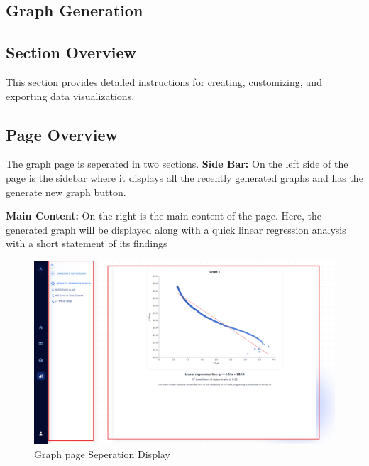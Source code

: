 \documentclass[12pt]{article}
\begin{document}
\subsection{Graph Generation}
\subsection*{Section Overview}
This section provides detailed instructions for creating, customizing, and
exporting data visualizations.

\subsection*{Page Overview}
The graph page is seperated in two sections. 
\newline \newline
\textbf{Side Bar:} \newline
On the left side of the page is the sidebar where it displays all the recently
generated graphs and has the generate new graph button.
\newline\newline

\noindent \textbf{Main Content:}\newline
On the right is the main content of the page. Here, the generated graph will be
displayed along with a quick linear regression analysis with a short statement
of its findings 
\begin{figure}[H]
    \centering
    \includegraphics[scale=0.3]{Images/graph page .png}
    \caption{Graph page Seperation Display}
    \label{fig:example}
\end{figure}
\end{document}
